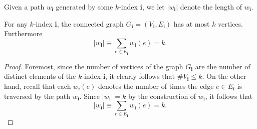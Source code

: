 

\begin{definition}
  \label{def:length_of_w_i}
  Given a path $w_\mathbf{i}$ generated by some $k$-index $\mathbf{i}$, we let $|w_\mathbf{i}|$ denote the length of $w_\mathbf{i}$. 
\end{definition}
\begin{lemma}[$|w_\mathbf{i}| = k$ : R-1-2 : lem:abs\_w\_i\_eq\_k]
  \label{lem:abs_w_i_eq_k}
  For any $k$-index $\mathbf{i}$, the connected graph $G_\mathbf{i} = (V_\mathbf{i},E_\mathbf{i})$ has at most $k$ vertices. Furthermore
  \[
  |w_\mathbf{i}| \equiv \sum_{e \in E_\mathbf{i}} w_\mathbf{i}(e) = k.
  \]
\end{lemma}
\begin{proof}
  Foremost, since the number of vertices of the graph $G_\mathbf{i}$ 
  are the number of distinct elements of the $k$-index $\mathbf{i}$, it clearly follows that $\#V_\mathbf{i} \leq k$.
  On the other hand, recall that each $w_i(e)$ denotes the number of times the edge $e \in E_\mathbf{i}$ is traversed by the path $w_\mathbf{i}$. 
  Since $|w_\mathbf{i}| = k$ by the construction of $w_\mathbf{i}$, it follows that
  \[
  |w_\mathbf{i}| \equiv \sum_{e \in E_\mathbf{i}} w_\mathbf{i}(e) = k.
  \]
\end{proof}
